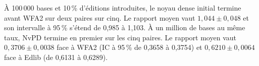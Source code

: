 À 100\,000 bases et 10\,\% d’éditions introduites, le noyau dense initial termine avant WFA2 sur deux paires sur cinq. Le rapport moyen vaut \(1{,}044\pm0{,}048\) et son intervalle à 95\,\% s’étend de 0,985 à 1,103. À un million de bases au même taux, NvPD termine en premier sur les cinq paires. Le rapport moyen vaut \(0{,}3706\pm0{,}0038\) face à WFA2 (IC à 95\,\% de 0,3658 à 0,3754) et \(0{,}6210\pm0{,}0064\) face à Edlib (de 0,6131 à 0,6289).






